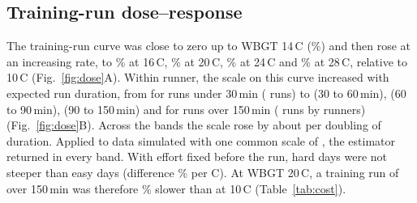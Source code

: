 \documentclass[12pt]{article}
\newcommand{\degC}{\,\textdegree C}
\begin{document}
\subsection{Training-run dose--response}
The training-run curve was close to zero up to WBGT 14\degC{} (\cFourteen\%) and then rose at an increasing rate, to \cSixteen\% at 16\degC, \cTwenty\% at 20\degC, \cTwentyfour\% at 24\degC{} and \cTwentyeight\% at 28\degC, relative to 10\degC{} (Fig.~\ref{fig:dose}A). Within runner, the scale on this curve increased with expected run duration, from \scLtThirty{} for runs under 30\,min (\nLtThirty{} runs) to \scThirtySixty{} (30 to 60\,min), \scSixtyNinety{} (60 to 90\,min), \scNinetyOneFifty{} (90 to 150\,min) and \scGtOneFifty{} for runs over 150\,min (\nGtOneFifty{} runs by \nGtOneFiftyRunners{} runners) (Fig.~\ref{fig:dose}B). Across the bands the scale rose by about \trainPerDoubling{} per doubling of duration. Applied to data simulated with one common scale of \placeboTrue, the estimator returned \placeboRange{} in every band. With effort fixed before the run, hard days were not steeper than easy days (difference \effortGradient\% per \textdegree C). At WBGT 20\degC, a training run of over 150\,min was therefore \longTwenty\% slower than at 10\degC{} (Table~\ref{tab:cost}).
\end{document}
